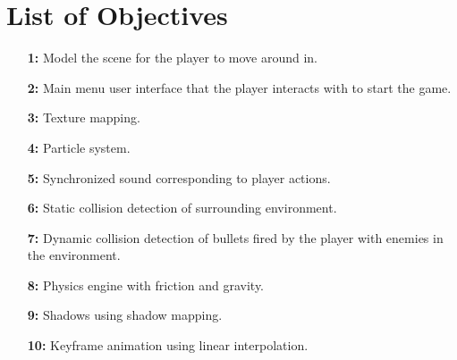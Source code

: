 \documentclass {article}
\begin{document}
\newpage
\printbibliography[heading=bibintoc, title={References}] %

\newpage
\appendix
\section{List of Objectives}\label{sec:objectives}
\begin{enumerate}
    \item[\textbf{1:}]
    Model the scene for the player to move around in.

    \item[\textbf{2:}]
    Main menu user interface that the player interacts with to start the game.

    \item[\textbf{3:}]
    Texture mapping.

    \item[\textbf{4:}]
    Particle system.

    \item[\textbf{5:}]
    Synchronized sound corresponding to player actions.

    \item[\textbf{6:}]
    Static collision detection of surrounding environment.

    \item[\textbf{7:}]
    Dynamic collision detection of bullets fired by the player with enemies in the environment.

    \item[\textbf{8:}]
    Physics engine with friction and gravity.

    \item[\textbf{9:}]
    Shadows using shadow mapping.

    \item[\textbf{10:}]
    Keyframe animation using linear interpolation.
\end{enumerate}
\end{document}
